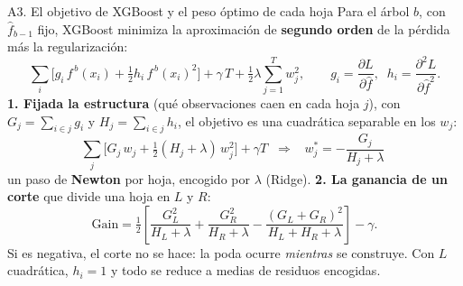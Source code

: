 \documentclass{beamer}
\newcommand{\1}{\mathbb{I}}
\begin{document}
\begin{frame}{A3. El objetivo de XGBoost y el peso óptimo de cada hoja}
\small
Para el árbol $b$, con $\hat{f}_{b-1}$ fijo, XGBoost minimiza la aproximación de \textbf{segundo orden} de la pérdida más la regularización:
\[ \sum_i \Big[ g_i\, f^{\,b}(x_i) + \tfrac{1}{2} h_i\, f^{\,b}(x_i)^2 \Big] + \gamma\,T + \tfrac{1}{2}\lambda \sum_{j=1}^{T} w_j^2, \qquad g_i = \frac{\partial L}{\partial \hat{f}}, \;\; h_i = \frac{\partial^2 L}{\partial \hat{f}^2}. \]
\pause
\textbf{1. Fijada la estructura} (qué observaciones caen en cada hoja $j$), con $G_j = \sum_{i \in j} g_i$ y $H_j = \sum_{i \in j} h_i$, el objetivo es una cuadrática separable en los $w_j$:
\[ \sum_j \Big[ G_j\, w_j + \tfrac{1}{2}(H_j + \lambda)\, w_j^2 \Big] + \gamma T \;\;\Longrightarrow\;\; \boxed{\; w_j^{*} = -\frac{G_j}{H_j + \lambda} \;} \]
un paso de \textbf{Newton} por hoja, encogido por $\lambda$ (Ridge).
\pause
\textbf{2. La ganancia de un corte} que divide una hoja en $L$ y $R$:
\[ \text{Gain} = \tfrac{1}{2}\left[ \frac{G_L^2}{H_L + \lambda} + \frac{G_R^2}{H_R + \lambda} - \frac{(G_L + G_R)^2}{H_L + H_R + \lambda} \right] - \gamma. \]
Si es negativa, el corte no se hace: la poda ocurre \emph{mientras} se construye. Con $L$ cuadrática, $h_i = 1$ y todo se reduce a medias de residuos encogidas.
\end{frame}

\end{document}
